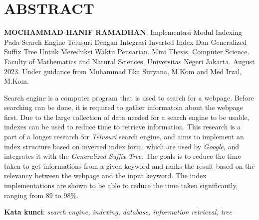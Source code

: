 \chapter*{\textbf{ABSTRACT}}

\textbf{MOCHAMMAD HANIF RAMADHAN}. Implementasi Modul Indexing Pada Search 
Engine Telusuri Dengan Integrasi Inverted Index Dan Generalized Suffix Tree 
Untuk Mereduksi Waktu Pencarian. Mini Thesis. Computer Science. Faculty of 
Mathematics and Natural Sciences, Universitas Negeri Jakarta. August 2023.
Under guidance from Muhammad Eka Suryana, M.Kom and Med Irzal, M.Kom.

\vspace{5mm}
\noindent{}
Search engine is a computer program that is used to search for a webpage. Before 
searching can be done, it is required to gather informatoin about the webpage 
first. Due to the large collection of data needed for a search engine to be 
usable, indexes can be used to reduce time to retrieve information. This 
research is a part of a longer research for \textit{Telusuri} search engine, and
aims to implement an index structure based on inverted index form, which are 
used by \textit{Google}, and integrates it with the \textit{Generalized Suffix 
Tree}. The goals is to reduce the time taken to get informations from a given 
keyword and ranks the result based on the relevancy between the webpage and the 
input keyword. The index implementations are shown to be able to reduce the time 
taken significantly, ranging from 89 to 98\%.

\vspace{5mm}
\noindent{}
\textbf{Kata kunci}: \textit{search engine, indexing, database, information 
retrieval, tree}
